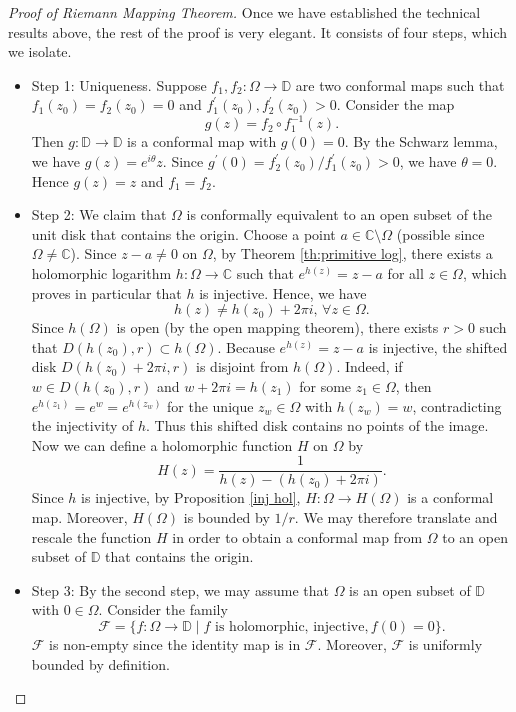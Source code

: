 \documentclass{article}
\theoremstyle{definition}
\newcommand{\C}{\mathbb{C}}
\begin{document}
\begin{proof}[Proof of Riemann Mapping Theorem]
    Once we have established the technical results above, the rest of the proof is very elegant. It consists of four steps, which we isolate.
    \begin{itemize}
        \item Step 1: Uniqueness. Suppose \(f_1,f_2\colon\Omega\to\mathbb{D}\) are two conformal maps such that \(f_1(z_0)=f_2(z_0)=0\) and \(f_1^{\prime}(z_0), f_2^{\prime}(z_0)>0\). Consider the map
        \begin{equation*}
            g(z) = f_2 \circ f_1^{-1}(z).
        \end{equation*}
        Then \(g\colon\mathbb{D}\to\mathbb{D}\) is a conformal map with \(g(0)=0\). By the Schwarz lemma, we have $g(z)=e^{i\theta}z$. Since \(g^{\prime}(0) = f_2^{\prime}(z_0)/{f_1^{\prime}(z_0)}>0\), we have \(\theta=0\). Hence \(g(z)=z\) and \(f_1=f_2\).
        \item Step 2: We claim that $\Omega$ is  conformally equivalent to an open subset of the unit disk that contains the origin. Choose a point \(a\in\C\setminus\Omega\) (possible since \(\Omega\neq \C\)). Since $z-a\neq 0$ on $\Omega$,
        by Theorem \ref{th:primitive log}, there exists a holomorphic logarithm \(h\colon\Omega\to\C\) such that \(e^{h(z)}=z-a\) for all \(z\in\Omega\), which proves in particular that $h$ is injective. 
        Hence, we have 
        \begin{equation*}
            h(z)\neq h(z_0)+2\pi i,\,\forall z\in\Omega.
        \end{equation*}
        Since \(h(\Omega)\) is open (by the open mapping theorem), there exists \(r>0\) such that \(D(h(z_0),r)\subset h(\Omega)\). Because \(e^{h(z)}=z-a\) is injective, the shifted disk \(D(h(z_0)+2\pi i,r)\) is disjoint from \(h(\Omega)\). Indeed, if \(w\in D(h(z_0),r)\) and \(w+2\pi i=h(z_1)\) for some \(z_1\in\Omega\), then \(e^{h(z_1)}=e^{w}=e^{h(z_w)}\) for the unique \(z_w\in\Omega\) with \(h(z_w)=w\), 
        contradicting the injectivity of \(h\). Thus this shifted disk contains no points of the image. 
        Now we can define a holomorphic function $H$ on $\Omega$ by
        \begin{equation*}
            H(z) = \frac{1}{h(z)-(h(z_0)+2\pi i)}.
        \end{equation*} 
        Since $h$ is injective, by Proposition \ref{inj hol}, $H\colon \Omega \to H(\Omega)$ is a conformal map. Moreover, $H(\Omega)$ is bounded by $1/r$. We may therefore translate and rescale the function $H$ in order to obtain a conformal map from $\Omega$ to an open subset of $\mathbb{D}$ that contains the origin.
        \item Step 3: By the second step, we may assume that \(\Omega\)  is an open subset of \(\mathbb{D}\) with \(0\in\Omega\). Consider the family
        \begin{equation*}
            \mathcal{F} = \{f\colon\Omega\to\mathbb{D}\mid f\text{ is holomorphic, injective}, f(0)=0\}.
        \end{equation*}
        $\mathcal{F}$ is non-empty since the identity map is in $\mathcal{F}$. Moreover, $\mathcal{F}$ is uniformly bounded by definition. 
        

\end{itemize}
\end{proof}
\end{document}
